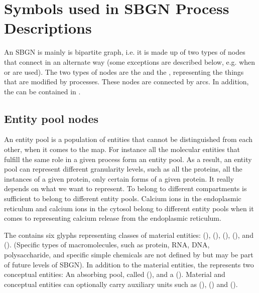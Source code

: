 \chapter{Symbols used in SBGN Process Descriptions}
\label{chp:symbols}

An SBGN \PDm is mainly is bipartite graph, i.e. it is made up of two types of nodes that connect in an alternate way (some exceptions are described below, e.g. when  or  are used). The two types of nodes are the  and the , representing the things that are modified by processes. These nodes are connected by arcs. In addition, the  can be contained in . 


\section{Entity pool nodes}\label{sec:EPNs}

An entity pool is a population of entities that cannot be distinguished from each other, when it comes to the \SBGNPDLone map. For instance all the molecular entities that fulfill the same role in a given process form an entity pool. As a result, an entity pool can represent different granularity levels, such as all the proteins, all the instances of a given protein, only certain forms of a given protein. It really depends on what we want to represent. To belong to different compartments is sufficient to belong to different entity pools. Calcium ions in the endoplasmic reticulum and calcium ions in the cytosol belong to different entity pools when it comes to representing calcium release from the endoplasmic reticulum.

The \PDl contains six glyphs representing classes of material entities:  (),  (),  (),  (), and  ().  (Specific types of macromolecules, such as protein, RNA, DNA, polysaccharide, and specific simple chemicals are not defined by \PD but may be part of future levels of SBGN). In addition to the material entities, the \PDl represents two conceptual entities: An absorbing pool, called  (), and a  ().  Material and conceptual entities can optionally carry auxiliary units such as  (),   () and  ().

